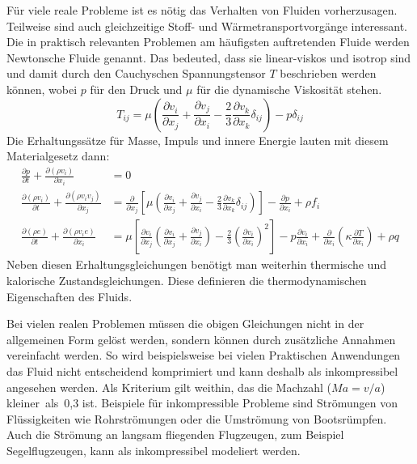 Für viele reale Probleme ist es nötig das Verhalten von Fluiden vorherzusagen.
Teilweise sind auch gleichzeitige Stoff- und Wärmetransportvorgänge interessant.
Die in praktisch relevanten Problemen am häufigsten auftretenden Fluide werden Newtonsche Fluide genannt.
Das bedeuted, dass sie linear-viskos und isotrop sind und damit durch den Cauchyschen
Spannungstensor $T$ beschrieben werden können, wobei $p$ für den Druck und $\mu$ für die dynamische Viskosität stehen.
\begin{equation}
  T_{ij} = \mu\left({\frac{\partial v_i}{\partial x_j}
  + \frac{\partial v_j}{\partial x_i}
-\frac{2}{3} \frac{\partial v_k}{\partial x_k} \delta_{ij}}\right)
-p\delta_{ij}
\end{equation}
Die
Erhaltungssätze für Masse, Impuls und innere Energie lauten mit diesem Materialgesetz dann:
\begin{align}
  \frac{\partial p}{\partial t} + \frac{\partial (\rho v_i)}{\partial x_i} &= 0\\
  \frac{\partial (\rho v_i)}{\partial t} + \frac{\partial (\rho v_i v_j)}{\partial x_j} &=
  \frac{\partial}{\partial x_j} \left[{\mu
  \left({\frac{\partial v_i}{\partial x_j}
  +\frac{\partial v_j}{\partial x_i}
  - \frac{2}{3} \frac{\partial v_k}{\partial x_k}\delta_{ij}}\right)}\right]
  -\frac{\partial p}{\partial x_i} + \rho f_i\\
  \frac{\partial (\rho e)}{\partial t} + \frac{\partial (\rho v_i e)}{\partial x_i} &=
  \mu \left[{\frac{\partial v_i}{\partial x_j}
  \left({\frac{\partial v_i}{\partial x_j}
  +\frac{\partial v_j}{\partial x_i}}\right)
  - \frac{2}{3} \left({\frac{\partial v_i}{\partial x_i}}\right)^2}\right]
  -p\frac{\partial v_i}{\partial x_i} +\frac{\partial}{\partial x_i}
  \left({\kappa \frac{\partial T}{\partial x_i}}\right)
  + \rho q
\end{align}
Neben diesen Erhaltungsgleichungen benötigt man weiterhin thermische und kalorische Zustands\-gleich\-ungen.
Diese definieren die thermodynamischen Eigenschaften des Fluids.

Bei
vielen realen Problemen müssen die obigen Gleichungen nicht in der allgemeinen Form gelöst werden, sondern
können durch zusätzliche Annahmen vereinfacht werden.
So wird beispielsweise bei vielen Praktischen Anwendungen das Fluid nicht entscheidend komprimiert
und kann deshalb als inkompressibel angesehen werden. Als Kriterium gilt weithin,
das die Machzahl ($Ma = v/a$) kleiner~als~0,3 ist. Beispiele für inkompressible Probleme
sind Strömungen von Flüssigkeiten wie Rohrströmungen oder die Umströmung von Bootsrümpfen.
Auch die Strömung an langsam fliegenden Flugzeugen, zum Beispiel Segelflugzeugen, kann als
inkompressibel modeliert werden.

